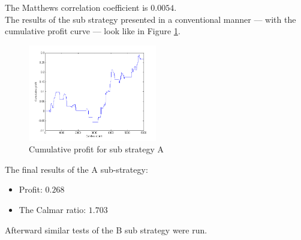 \documentclass{jtacs}
\begin{document}
\noindent The Matthews correlation coefficient is $0.0054.$\\
The results of the sub strategy presented in a conventional manner –-- with the cumulative profit curve --– look like in Figure \ref{rys8}.
\begin{figure}[ht]
\centering
\includegraphics[width = 0.5\textwidth]{pictures/PivotPointsA.png}
\caption{Cumulative profit for sub strategy A}
\label{rys8}
\end{figure}
\FloatBarrier
\noindent The final results of the A sub-strategy:
\begin{itemize}
\item Profit: $0.268$
\item The Calmar ratio: $1.703$
\end{itemize}
\vspace{1em}
\noindent Afterward similar tests of the B sub strategy were run.\\
\end{document}
